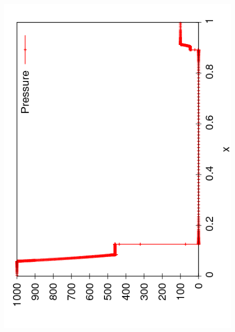 \documentclass{beamer}
\begin{document}
\begin{frame}
\begin{columns}
\begin{column}{0.5\textwidth}
\begin{overlayarea}{\textwidth}{0.9\textheight}
{          \includegraphics[angle=-90,width=0.9\textwidth]{figures/AMR_Pressure_10}
        }
        {
}
\end{overlayarea}
\end{column}
\end{columns}
\end{frame}
\end{document}
